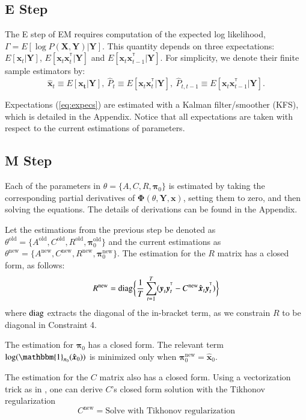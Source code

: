 \documentclass[times,twocolumn,final,authoryear]{elsarticle}
\providecommand{\mb}[1]{\boldsymbol{#1}}
\newcommand{\bx}{\mb{x}}
\newcommand{\by}{\mb{y}}
\newcommand{\bX}{\mb{X}}
\newcommand{\bY}{\mb{Y}}
\newcommand{\T}{^{\ensuremath{\mathsf{T}}}}           %
\newcommand{\diag}{\operatornamewithlimits{diag}}
\let\oldref\ref
\renewcommand{\ref}[1]{(\oldref{#1})}
\begin{document}
\subsection{E Step}
The E step of EM requires computation of the expected log likelihood, $\Gamma = E[\log P(\bX,\bY)|\bY]$. This quantity depends on three expectations: $E[\bx_t|\bY]$, $E[\bx_t\bx_t^{\T}|\bY]$ and $E[\bx_t\bx_{t-1}^{\T}|\bY]$. For simplicity, we denote their finite sample estimators by:
\begin{equation}\label{eq:expecs}
\hat{\bx}_t \equiv E[\mathbf{x_t}|\bY],\  \hat{P}_t  \equiv E[\bx_t\bx_t^{\T}|\bY],\  \hat{P}_{t,t-1}  \equiv E[\bx_t\bx_{t-1}^{\T}|\bY].
\end{equation}

Expectations \ref{eq:expecs} are estimated with a Kalman filter/smoother (KFS), which is detailed in the Appendix. Notice that all expectations are taken with respect to the current estimations of parameters.
\subsection{M Step}
Each of the parameters in $\theta =\{A,C,R,\mathbf{\pi}_0\}$ is estimated by taking the corresponding partial derivatives of $\mathbf{\Phi}(\theta,\bY,\bx)$, setting them to zero, and then solving the equations. The details of derivations can be found in the Appendix.

Let the estimations from the previous step be denoted as $\theta^{\text{old}} =\{A^{\text{old}},C^{\text{old}},R^{\text{old}},\mathbf{\pi}_0^{\text{old}}\}$ and the current estimations as $\theta^{\text{new}} =\{A^{\text{new}},C^{\text{new}},R^{\text{new}},\mathbf{\pi}_0^{\text{new}}\}$. The estimation for the $R$ matrix has a closed form, as follows:
\begin{equation}\label{eq:updateR}
R^{\text{new}} = \diag \biggl\{\frac{1}{T}\sum\limits_{t=1}^{T}(\by_t\by_t^{\T}-C^{\text{new}}\hat{\bx}_t\by_t^{\T})\biggr\}
\end{equation}
where $\diag$ extracts the diagonal of the in-bracket term, as we constrain $R$ to be diagonal in Constraint 4.

The estimation for $\mathbf{\pi}_0$ has a closed form. The relevant term $\log(\mathbbm{1}_{\mathbf{\pi}_0}(\hat{\bx}_0))$ is minimized only when $\mathbf{\pi}_0^{\text{new}} = \hat{\bx}_0$.

The estimation for the $C$ matrix also has a closed form. Using a vectorization trick as in \citet{turlach2005simultaneous}, one can derive $C$'s closed form solution with the Tikhonov regularization \citep{tikhonov1943stability}
\begin{equation}\label{eq:updatec}
C^{\text{new}} =\text{Solve with Tikhonov regularization}
\end{equation}
\end{document}
